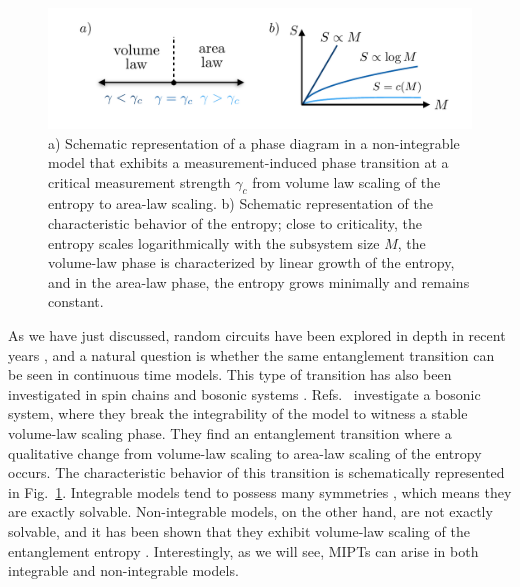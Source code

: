 \begin{figure}[ht]
    \centering
    \includegraphics[width=\textwidth]{Chapters/Plots/Chapter1/Chapter0_Fig1.pdf}
    \caption{a) Schematic representation of a phase diagram in a non-integrable model that exhibits a measurement-induced phase transition at a critical measurement strength $\gamma_c$ from volume law scaling of the entropy to area-law scaling. b) Schematic representation of the characteristic behavior of the entropy; close to criticality, the entropy scales logarithmically with the subsystem size $M$, the volume-law phase is characterized by linear growth of the entropy, and in the area-law phase, the entropy grows minimally and remains constant.}
    \label{fig:Chapter0_Fig1}
\end{figure}

As we have just discussed, random circuits have been explored in depth in recent years \cite{fisher2022}, and a natural question is whether the same entanglement transition can be seen in continuous time models. This type of transition has also been investigated in spin chains and bosonic systems \cite{fuji2020,tang2020,biella2021,doggen2022, botzung2021, muller2022}. Refs.~\cite{fuji2020,tang2020,doggen2022} investigate a bosonic system, where they break the integrability of the model to witness a stable volume-law scaling phase. They find an entanglement transition where a qualitative change from volume-law scaling to area-law scaling of the entropy occurs. The characteristic behavior of this transition is schematically represented in Fig.~\ref{fig:Chapter0_Fig1}. Integrable models tend to possess many symmetries \cite{retore2022}, which means they are exactly solvable. Non-integrable models, on the other hand, are not exactly solvable, and it has been shown that they exhibit volume-law scaling of the entanglement entropy \cite{nakagawa2018}. Interestingly, as we will see, MIPTs can arise in both integrable and non-integrable models. 


